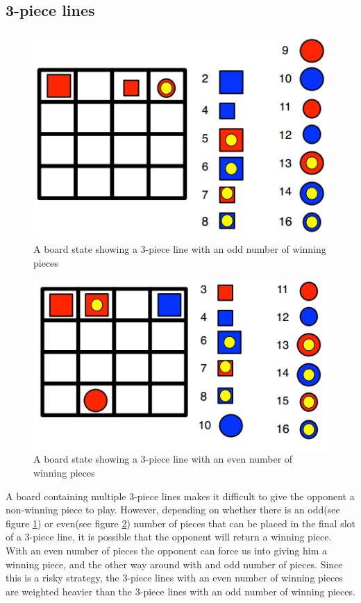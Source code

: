 \subsection{3-piece lines}
\begin{figure}[htb]
\includegraphics{pictures/3-odd.png}
\caption[A 3-piece line in \quarto{}]{A board state showing a 3-piece line with 
an odd number of winning pieces}
\label{fig:3-odd}
\end{figure}

\begin{figure}[htb]
\includegraphics{pictures/3-even.png}
\caption[A 3-piece line in \quarto{}]{A board state showing a 3-piece line with 
an even number of winning pieces}
\label{fig:3-even}
\end{figure}
A board containing multiple 3-piece lines makes it difficult to give the 
opponent a non-winning piece to play. However, depending on whether there is 
an odd(see figure \ref{fig:3-odd}) or even(see figure \ref{fig:3-even}) 
number of pieces that can be placed in the final slot of a 
3-piece line, it is possible that the opponent will return a winning 
piece. With an even number of pieces the opponent can force us into giving
him a winning piece, and the other way around with and odd number of pieces. 
Since this is a risky strategy, the 3-piece lines with an even number 
of winning pieces are weighted heavier than the 3-piece lines with an odd 
number of winning pieces.

